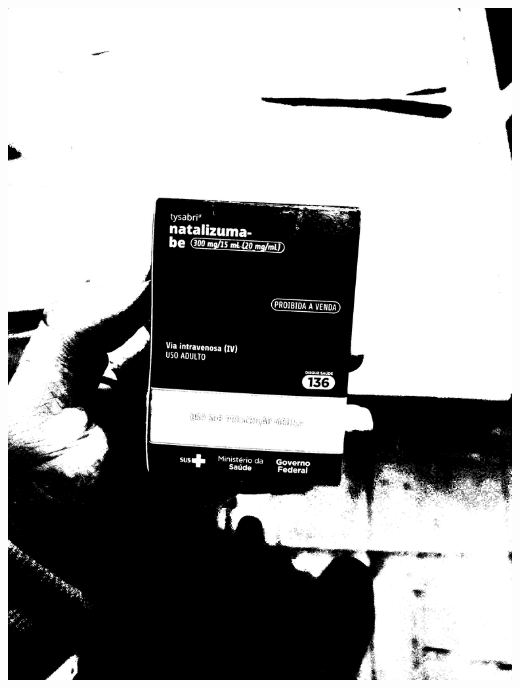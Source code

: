 \begin{frame}
	\centering
	\begin{columns}
		\begin{column}{0.24\textwidth}\centering
			\includegraphics[height=0.35\textheight]{../pictures/tysabri_r_thresh_recomposed_cmyk.jpg}
			\\\vspace{\floatsep}

\end{column}
\end{columns}
\end{frame}
